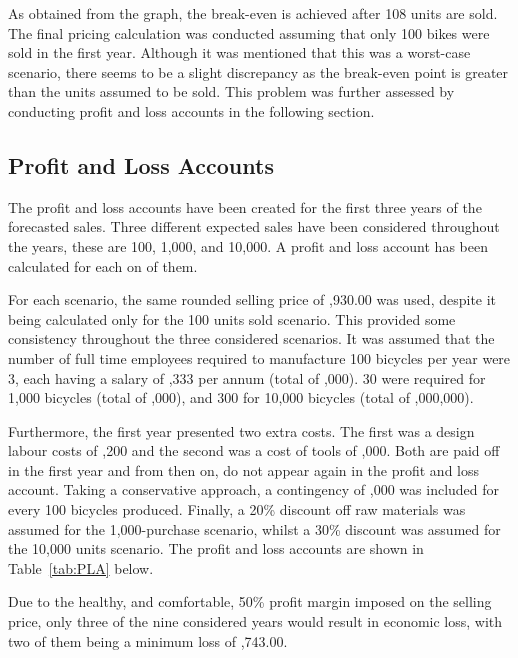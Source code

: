 \documentclass[a4paper,11pt]{article}
\begin{document}
As obtained from the graph, the break-even is achieved after 108 units are sold. The final pricing calculation was conducted assuming that only 100 bikes were sold in the first year. Although it was mentioned that this was a worst-case scenario, there seems to be a slight discrepancy as the break-even point is greater than the units assumed to be sold. This problem was further assessed by conducting profit and loss accounts in the following section. 

\subsection{Profit and Loss Accounts}

The profit and loss accounts have been created for the first three years of the forecasted sales. Three different expected sales have been considered throughout the years, these are 100, 1,000, and 10,000. A profit and loss account has been calculated for each on of them. 

For each scenario, the same rounded selling price of ,930.00 was used, despite it being calculated only for the 100 units sold scenario. This provided some consistency throughout the three considered scenarios. It was assumed that the number of full time employees required to manufacture 100 bicycles per year were 3, each having a salary of ,333 per annum (total of ,000). 30 were required for 1,000 bicycles (total of ,000), and 300 for 10,000 bicycles (total of ,000,000). 

Furthermore, the first year presented two extra costs. The first was a design labour costs of ,200 and the second was a cost of tools of ,000. Both are paid off in the first year and from then on, do not appear again in the profit and loss account. Taking a conservative approach, a contingency of ,000 was included for every 100 bicycles produced. Finally, a 20\% discount off raw materials was assumed for the 1,000-purchase scenario, whilst a 30\% discount was assumed for the 10,000 units scenario. The profit and loss accounts are shown in Table~\ref{tab:PLA} below. 

Due to the healthy, and comfortable, 50\% profit margin imposed on the selling price, only three of the nine considered years would result in economic loss, with two of them being a minimum loss of ,743.00. 
\end{document}
